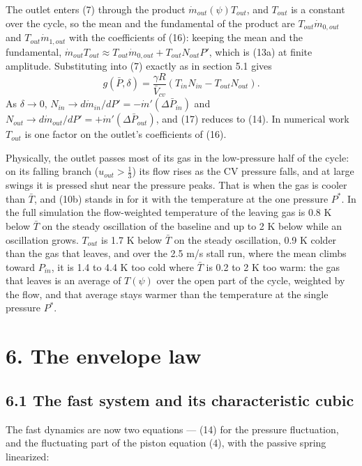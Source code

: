 \documentclass[11pt]{article}
\begin{document}
The outlet enters (7) through the product $\dot m_{out}(\psi)T_{out}$, and $T_{out}$ is a constant over the cycle, so the mean and the fundamental of the product are $T_{out}\dot m_{0,out}$ and $T_{out}\dot m_{1,out}$ with the coefficients of (16): keeping the mean and the fundamental, $\dot m_{out}T_{out} \approx T_{out}\dot m_{0,out} + T_{out}N_{out}P'$, which is (13a) at finite amplitude. Substituting into (7) exactly as in section 5.1 gives
\begin{equation}
g(\bar P,\delta) = \frac{\gamma R}{\bar V_{cv}}\left(T_{in}N_{in} - T_{out}N_{out}\right) . \tag{17}
\end{equation}
As $\delta \to 0$, $N_{in} \to d\dot m_{in}/dP' = -\dot m'(\Delta\bar P_{in})$ and $N_{out} \to d\dot m_{out}/dP' = +\dot m'(\Delta\bar P_{out})$, and (17) reduces to (14). In numerical work $T_{out}$ is one factor on the outlet's coefficients of (16).

Physically, the outlet passes most of its gas in the low-pressure half of the cycle: on its falling branch ($u_{out} > \tfrac13$) its flow rises as the CV pressure falls, and at large swings it is pressed shut near the pressure peaks. That is when the gas is cooler than $\bar T$, and (10b) stands in for it with the temperature at the one pressure $P^*$. In the full simulation the flow-weighted temperature of the leaving gas is 0.8 K below $\bar T$ on the steady oscillation of the baseline and up to 2 K below while an oscillation grows. $T_{out}$ is 1.7 K below $\bar T$ on the steady oscillation, 0.9 K colder than the gas that leaves, and over the 2.5 m/s stall run, where the mean climbs toward $P_{in}$, it is 1.4 to 4.4 K too cold where $\bar T$ is 0.2 to 2 K too warm: the gas that leaves is an average of $T(\psi)$ over the open part of the cycle, weighted by the flow, and that average stays warmer than the temperature at the single pressure $P^*$.

\section*{6. The envelope law}

\subsection*{6.1 The fast system and its characteristic cubic}

The fast dynamics are now two equations --- (14) for the pressure fluctuation, and the fluctuating part of the piston equation (4), with the passive spring linearized:
\end{document}
